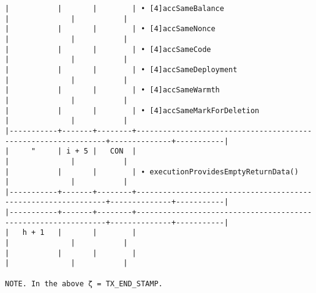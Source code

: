 \documentclass[varwidth=\maxdimen,margin=0.5cm,multi={verbatim}]{standalone}
\begin{document}
\begin{verbatim}
|           |       |        | • [4]accSameBalance                                           |              |           |
|           |       |        | • [4]accSameNonce                                             |              |           |
|           |       |        | • [4]accSameCode                                              |              |           |
|           |       |        | • [4]accSameDeployment                                        |              |           |
|           |       |        | • [4]accSameWarmth                                            |              |           |
|           |       |        | • [4]accSameMarkForDeletion                                   |              |           |
|-----------+-------+--------+---------------------------------------------------------------+--------------+-----------|
|     "     | i + 5 |   CON  |                                                               |              |           |
|           |       |        | ∙ executionProvidesEmptyReturnData()                          |              |           |
|-----------+-------+--------+---------------------------------------------------------------+--------------+-----------|
|-----------+-------+--------+---------------------------------------------------------------+--------------+-----------|
|   h + 1   |       |        |                                                               |              |           |
|           |       |        |                                                               |              |           |

NOTE. In the above ζ = TX_END_STAMP.
\end{verbatim}
\end{document}
